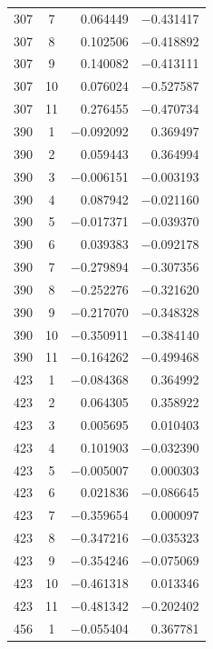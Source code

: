 \documentclass[12pt,a4paper,twoside]{article}
\numberwithin{equation}{section}
\begin{document}
{\begin{longtable}{cc rr}
    307 & 7 & 0.064449 & \ensuremath{-}0.431417 \\
    307 & 8 & 0.102506 & \ensuremath{-}0.418892 \\
    307 & 9 & 0.140082 & \ensuremath{-}0.413111 \\
    307 & 10 & 0.076024 & \ensuremath{-}0.527587 \\
    307 & 11 & 0.276455 & \ensuremath{-}0.470734 \\
    390 & 1 & \ensuremath{-}0.092092 & 0.369497 \\
    390 & 2 & 0.059443 & 0.364994 \\
    390 & 3 & \ensuremath{-}0.006151 & \ensuremath{-}0.003193 \\
    390 & 4 & 0.087942 & \ensuremath{-}0.021160 \\
    390 & 5 & \ensuremath{-}0.017371 & \ensuremath{-}0.039370 \\
    390 & 6 & 0.039383 & \ensuremath{-}0.092178 \\
    390 & 7 & \ensuremath{-}0.279894 & \ensuremath{-}0.307356 \\
    390 & 8 & \ensuremath{-}0.252276 & \ensuremath{-}0.321620 \\
    390 & 9 & \ensuremath{-}0.217070 & \ensuremath{-}0.348328 \\
    390 & 10 & \ensuremath{-}0.350911 & \ensuremath{-}0.384140 \\
    390 & 11 & \ensuremath{-}0.164262 & \ensuremath{-}0.499468 \\
    423 & 1 & \ensuremath{-}0.084368 & 0.364992 \\
    423 & 2 & 0.064305 & 0.358922 \\
    423 & 3 & 0.005695 & 0.010403 \\
    423 & 4 & 0.101903 & \ensuremath{-}0.032390 \\
    423 & 5 & \ensuremath{-}0.005007 & 0.000303 \\
    423 & 6 & 0.021836 & \ensuremath{-}0.086645 \\
    423 & 7 & \ensuremath{-}0.359654 & 0.000097 \\
    423 & 8 & \ensuremath{-}0.347216 & \ensuremath{-}0.035323 \\
    423 & 9 & \ensuremath{-}0.354246 & \ensuremath{-}0.075069 \\
    423 & 10 & \ensuremath{-}0.461318 & 0.013346 \\
    423 & 11 & \ensuremath{-}0.481342 & \ensuremath{-}0.202402 \\
    456 & 1 & \ensuremath{-}0.055404 & 0.367781 \\

\end{longtable}}
\end{document}
